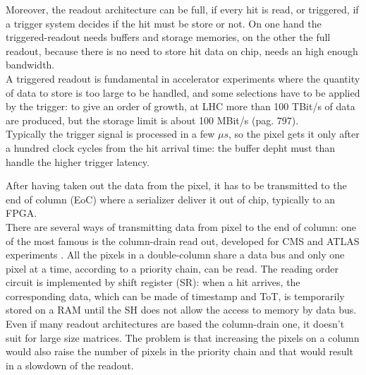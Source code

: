    Moreover, the readout architecture can be full, if every hit is read, or triggered, if a trigger system decides if the hit must be store or not. On one hand the triggered-readout needs buffers and storage memories, on the other the full readout, because there is no need to store hit data on chip, needs an high enough bandwidth.\\
   A triggered readout is fundamental in accelerator experiments where the quantity of data to store is too large to be handled, and some selections have to be applied by the trigger: to give an order of growth, at LHC more than 100 TBit/s of data are produced, but the storage limit is about 100 MBit/s \cite{K-Wermes} (pag. 797).\\
   Typically the trigger signal is processed in a few $\mu s$, so the pixel gets it only after a hundred clock cycles from the hit arrival time: the buffer depht must than handle the higher trigger latency. 
 
   After having taken out the data from the pixel, it has to be transmitted to the end of column (EoC) where a serializer deliver it out of chip, typically to an FPGA.\\ 
   There are several ways of transmitting data from pixel to the end of column: one of the most famous is the column-drain read out, developed for CMS and ATLAS experiments \cite{column-drain}. 
   All the pixels in a double-column share a data bus and only one pixel at a time, according to a priority chain, can be read. The reading order circuit is implemented by shift register (SR): when a hit arrives, the corresponding data, which can be made of timestamp and ToT, is temporarily stored on a RAM until the SH does not allow the access to memory by data bus. \\
   Even if many readout architectures are based the column-drain one, it doesn't suit for large size matrices. The problem is that increasing the pixels on a column would also raise the number of pixels in the priority chain and that would result in a slowdown of the readout. 

